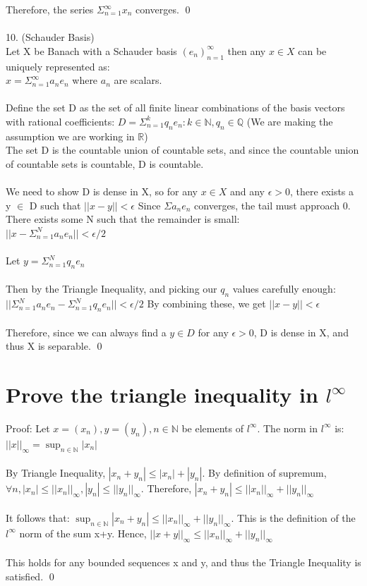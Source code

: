 \documentclass{article}
\begin{document}
Therefore, the series $\Sigma_{n=1}^\infty x_n$ converges.
\qed
\\
\\
10. (Schauder Basis)
\\
Let X be Banach with a Schauder basis $ (e_n)_{n=1}^\infty$ then  any $x \in X$ can be uniquely represented as: 
\\
$x = \Sigma_{n=1}^\infty a_ne_n$ where $a_n$ are scalars. 
\\
\\
Define the set D as the set of all finite linear combinations of the basis vectors with rational coefficients: $D = {\Sigma_{n=1}^k q_ne_n : k \in \mathbb{N}, q_n \in \mathbb{Q}}$ (We are making the assumption we are working in $\mathbb{R}$)
\\
The set D is the countable union of countable sets, and since the countable union of countable sets is countable, D is countable. 
\\
\\
We need to show D is dense in X, so for any $x \in X$ and any $\epsilon > 0$, there exists a y $\in$ D such that $||x-y|| < \epsilon$ Since $\Sigma a_ne_n$ converges, the tail must approach 0. There exists some N such that the remainder is small: 
\\
$|| x -\Sigma_{n=1}^Na_ne_n|| < \epsilon/2$
\\
\\
Let $ y = \Sigma_{n=1}^Nq_ne_n$
\\
\\
Then by the Triangle Inequality, and picking our $q_n$ values carefully enough: $||\Sigma_{n=1}^Na_ne_n -\Sigma_{n=1}^Nq_ne_n || < \epsilon/2$
By combining these, we get $||x-y|| < \epsilon$
\\
\\
Therefore, since we can always find a $y \in D$ for any $\epsilon > 0$, D is dense in X, and thus X is separable. \qed 

\section{Prove the triangle inequality in $l^\infty$}
Proof: Let $x=(x_n), y=(y_n), n \in \mathbb{N}$ be elements of $l^\infty$. The norm in $l^\infty$ is: $||x||_\infty = \sup_{n\in \mathbb{N}}|x_n|$
\\
\\
By Triangle Inequality, $|x_n+y_n| \leq |x_n| + |y_n|$. By definition of supremum, $\forall n, |x_n| \leq ||x_n||_\infty, |y_n|\leq ||y_n||_\infty$. Therefore, $|x_n+y_n| \leq ||x_n||_\infty + ||y_n||_\infty$
\\
\\
It follows that: $\sup_{n\in \mathbb{N}} |x_n+y_n| \leq  ||x_n||_\infty + ||y_n||_\infty$. This is the definition of the $l^\infty$ norm of the sum x+y. Hence, $||x+y||_\infty \leq ||x_n||_\infty + ||y_n||_\infty $
\\
\\
This holds for any bounded sequences x and y, and thus the Triangle Inequality is satisfied. \qed
\end{document}
